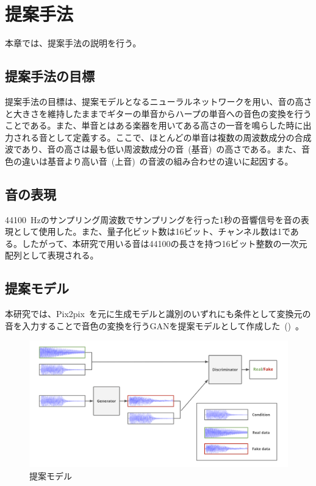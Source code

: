 \chapter{提案手法}

本章では、提案手法の説明を行う。

\section{提案手法の目標}

提案手法の目標は、提案モデルとなるニューラルネットワークを用い、音の高さと大きさを維持したままでギターの単音からハープの単音への音色の変換を行うことである。また、単音とはある楽器を用いてある高さの一音を鳴らした時に出力される音として定義する。ここで、ほとんどの単音は複数の周波数成分の合成波であり、音の高さは最も低い周波数成分の音~(基音)~の高さである。また、音色の違いは基音より高い音~(上音)~の音波の組み合わせの違いに起因する。

\section{音の表現}

44100~Hzのサンプリング周波数でサンプリングを行った1秒の音響信号を音の表現として使用した。また、量子化ビット数は16ビット、チャンネル数は1である。したがって、本研究で用いる音は44100の長さを持つ16ビット整数の一次元配列として表現される。

\section{提案モデル}
\label{sec:proposed}

本研究では、Pix2pix~\cite{pix2pix}を元に生成モデルと識別のいずれにも条件として変換元の音を入力することで音色の変換を行うGANを提案モデルとして作成した~()~。

\begin{figure}[b]
\centering
\includegraphics[width=0.75\columnwidth]{figure/pr_model.png}
\caption[本研究の提案モデル]{提案モデル}
\label{fig:pr_model}
\end{figure}

